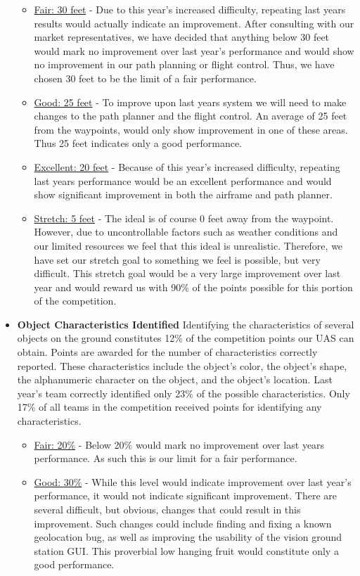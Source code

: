 \documentclass[]{auvsi_doc}
\begin{document}
\begin{itemize}
	\begin{itemize}
	\item  \underline{Fair: 30 feet} -  Due to this year's increased difficulty, repeating last years results would actually indicate an improvement. After consulting with our market representatives, we have decided that anything below 30 feet would mark no improvement over last year's performance and would show no improvement in our path planning or flight control. Thus, we have chosen 30 feet to be the limit of a fair performance. 
	\item \underline{Good: 25 feet} -  To improve upon last years system we will need to make changes to the path planner and the flight control. An average of 25 feet from the waypoints, would only show improvement in one of these areas. Thus 25 feet indicates only a good performance.
	\item \underline{Excellent: 20 feet} -  Because of this year's increased difficulty, repeating last years performance would be an excellent performance and would show significant improvement in both the airframe and path planner.
	\item \underline{Stretch: 5 feet} -  The ideal is of course 0 feet away from the waypoint. However, due to uncontrollable factors such as weather conditions and our limited resources we feel that this ideal is unrealistic. Therefore, we have set our stretch goal to something we feel is possible, but very difficult. This stretch goal would be a very large improvement over last year and would reward us with 90\% of the points possible for this portion of the competition. 
	\end{itemize}
\item \textbf{Object Characteristics Identified} Identifying the characteristics of several objects on the ground constitutes 12\% of the competition points our UAS can obtain. Points are awarded for the number of characteristics correctly reported. These characteristics include the object's color, the object's shape, the alphanumeric character on the object, and the object's location. Last year's team correctly identified only 23\% of the possible characteristics. Only 17\% of all teams in the competition received points for identifying any characteristics.
	\begin{itemize}
	\item  \underline{Fair: 20\%} -  Below 20\% would mark no improvement over last years performance. As such this is our limit for a fair performance.
	\item \underline{Good: 30\%} -  While this level would indicate improvement over last year's performance, it would not indicate significant improvement. There are several difficult, but obvious, changes that could result in this improvement. Such changes could include finding and fixing a known geolocation bug, as well as improving the usability of the vision ground station GUI. This proverbial low hanging fruit would constitute only a good performance.

\end{itemize}
\end{itemize}
\end{document}
